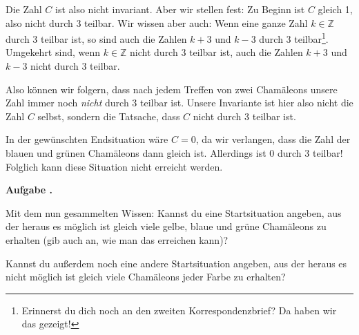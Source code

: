 \documentclass[a4paper,ngerman,12pt]{scrartcl}
\newcommand{\ZZ}{\mathbb{Z}}
\theoremstyle{definition}
\theoremstyle{plain}
\theoremstyle{remark}
\newlength{\aufgabenskip}
\newcounter{aufgabennummer}
\newenvironment{aufgabe}[1]{
	\addtocounter{aufgabennummer}{1}
	\textbf{Aufgabe \theaufgabennummer.} \emph{#1} \par
}{\vspace{\aufgabenskip}}
\begin{document}
Die Zahl $C$ ist also nicht invariant. Aber wir stellen fest: Zu Beginn ist $C$ gleich 1, also nicht durch 3 teilbar. Wir wissen aber auch: Wenn eine ganze Zahl $k \in \ZZ$ durch 3 teilbar ist, so sind auch die Zahlen $k + 3$ und $k - 3$ durch 3 teilbar\footnote{Erinnerst du dich noch an den zweiten Korrespondenzbrief? Da haben wir das gezeigt!}. Umgekehrt sind, wenn $k \in \ZZ$ nicht durch 3 teilbar ist, auch die Zahlen $k + 3$ und $k - 3$ nicht durch 3 teilbar. 

Also können wir folgern, dass nach jedem Treffen von zwei Chamäleons unsere Zahl immer noch \emph{nicht} durch 3 teilbar ist. Unsere Invariante ist hier also nicht die Zahl $C$ selbst, sondern die Tatsache, dass $C$ nicht durch 3 teilbar ist. 

In der gewünschten Endsituation wäre $C = 0$, da wir verlangen, dass die Zahl der blauen und grünen Chamäleons dann gleich ist. Allerdings ist $0$ durch $3$ teilbar! Folglich kann diese Situation nicht erreicht werden.

\begin{aufgabe}{}
	Mit dem nun gesammelten Wissen: Kannst du eine Startsituation angeben, aus der heraus es möglich ist gleich viele gelbe, blaue und grüne Chamäleons zu erhalten (gib auch an, wie man das erreichen kann)?
	
	Kannst du außerdem noch eine andere Startsituation angeben, aus der heraus es nicht möglich ist gleich viele Chamäleons jeder Farbe zu erhalten?
\end{aufgabe}
\end{document}
